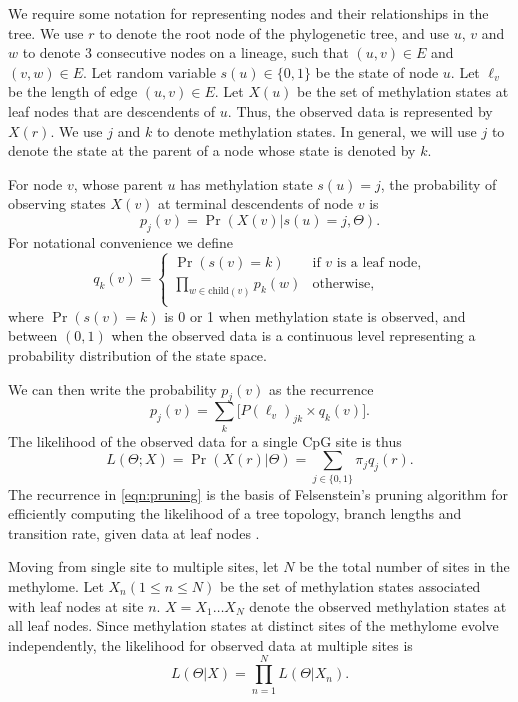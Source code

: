 \documentclass[11pt]{article}
\theoremstyle{theorem}
\theoremstyle{proposition}
\newcommand{\child}[1]{\ensuremath{\mathrm{child}(#1)}}
\begin{document}
We require some notation for representing nodes and their
relationships in the tree.  We use $r$ to denote the root node of the
phylogenetic tree, and use $u$, $v$ and $w$ to denote 3 consecutive
nodes on a lineage, such that $(u, v)\in E$ and $(v, w)\in E$.  Let
random variable $s(u) \in \{0, 1\}$ be the state of node $u$. Let
$\ell_{v}$ be the length of edge $(u, v)\in E$. Let $X(u)$ be the set
of methylation states at leaf nodes that are descendents of $u$. Thus,
the observed data is represented by $X(r)$.  We use $j$ and $k$ to
denote methylation states. In general, we will use $j$ to denote the
state at the parent of a node whose state is denoted by $k$.


For node $v$, whose parent $u$ has methylation state $s(u) = j$, the
probability of observing states $X(v)$ at terminal descendents of node
$v$ is
\[
p_{j}(v) = \Pr(X(v) | s(u) = j, \Theta).
\]
For notational convenience we define
\[
q_k(v) = \left\{
\begin{array}{ll}
  \Pr(s(v) = k) & \mbox{if $v$ is a leaf node,} \\
  \prod_{w\in \child{v}}  p_{k}(w) & \mbox{otherwise,} \\
\end{array}\right.
\]
where $\Pr(s(v) = k)$ is 0 or 1 when methylation state is observed,
and between $(0,1)$ when the observed data is a continuous level
representing a probability distribution of the state space.


We can then write the probability $p_j(v)$ as the recurrence
\begin{equation}\label{eqn:pruning}
p_{j}(v) = \sum_{k}\Big[P(\ell_{v})_{jk} \times q_k(v)\Big].
\end{equation}
The likelihood of the observed data for a single CpG site is thus
\begin{equation}
 L(\Theta;X) = \Pr(X(r)|\Theta) = \sum_{j\in\{0,1\}}\pi_{j}q_j(r).
\end{equation}
The recurrence in \eqref{eqn:pruning} is the basis of Felsenstein's
pruning algorithm for efficiently computing the likelihood of a tree
topology, branch lengths and transition rate, given data at leaf nodes
\citep{felsenstein1981evolutionary}.

Moving from single site to multiple sites, let $N$ be the total number of
sites in the methylome.  Let $X_n (1\leq n\leq N)$ be the set of
methylation states associated with leaf nodes at site
$n$. $X=X_1\ldots X_N$ denote the observed methylation states at all
leaf nodes. Since methylation states at distinct sites of the
methylome evolve independently, the likelihood for observed data at
multiple sites is
\[
L(\Theta|X) = \prod_{n=1}^NL(\Theta|X_n).
\]
\end{document}
